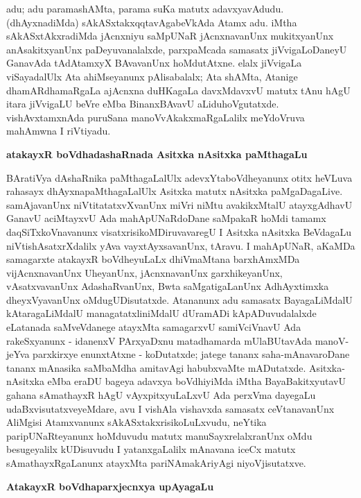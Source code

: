 adu; adu paramashAMta, parama suKa matutx adavxyavAdudu. (dhAyxnadiMda) sAkASxtakxqqtavAgabeVkAda Atamx adu. iMtha sAkASxtAkxradiMda jAcnxniyu saMpUNaR jAcnxnavanUnx mukitxyanUnx anAsakitxyanUnx paDeyuvanalalxde, parxpaMcada samasatx jiVvigaLoDaneyU GanavAda tAdAtamxyX BAvavanUnx hoMdutAtxne. elalx jiVvigaLa viSayadalUlx Ata ahiMseyanunx pAlisabalalx; Ata shAMta, Atanige dhamARdhamaRgaLa ajAcnxna duHKagaLa davxMdavxvU matutx tAnu hAgU itara jiVvigaLU beVre eMba BinanxBAvavU aLiduhoVgutatxde. vishAvxtamxnAda puruSana manoVvAkakxmaRgaLalilx meYdoVruva mahAmwna I riVtiyadu.

\bigskip
\begin{center}
{\Large\bf atakayxR boVdhadashaRnada Asitxka nAsitxka paMthagaLu}
\end{center}

BAratiVya dAshaRnika paMthagaLalUlx adevxYtaboVdheyanunx otitx heVLuva rahasayx dhAyxnapaMthagaLalUlx Asitxka matutx nAsitxka paMgaDagaLive. samAjavanUnx niVtitatatxvXvanUnx miVri niMtu avakikxMtalU atayxgAdhavU GanavU aciMtayxvU Ada mahApUNaR\-doDane saMpakaR hoMdi tamamx daqSiTxkoVnavanunx visatxrisikoMDiruvavaregU I Asitxka nAsitxka BeVdagaLu niVtishAsatxrXdalilx yAva vayxtAyxsavanUnx, tAravu. I mahApUNaR, aKaMDa samagarxte atakayxR boVdheyuLaLx dhiVmaMtana barxhAmxMDa vijAcnxnavanUnx UheyanUnx, jAcnxnavanUnx garxhikeyanUnx, vAsatxvavanUnx AdashaRvanUnx, Bwta saMgatigaLanUnx AdhAyxtimxka dheyxVyavanUnx oMdugUDisutatxde. Atananunx adu samasatx BayagaLiMdalU kAtaragaLiMdalU managatatxliniMdalU dUramADi kApADuvudalalxde eLatanada saMveVdanege atayxMta samagarxvU samiVciVnavU Ada rakeSxyanunx - idanenxV PArxyaDxnu matadhamarda mUlaBUtavAda manoV-jeYva parxkirxye enunxtAtxne - koDutatxde; jatege tananx saha-mAnavaroDane tananx mAnasika saMbaMdha amitavAgi habubxvaMte mADutatxde. Asitxka-nAsitxka eMba eraDU bageya adavxya boVdhiyiMda iMtha BayaBakitxyutavU gahana sAmathayxR hAgU vAyxpitxyuLaLxvU Ada perxVma dayegaLu udaBxvisutatxveyeMdare, avu I vishAla vishavxda samasatx ceVtanavanUnx AliMgisi Atamxvanunx sAkASxtakxrisikoLuLxvudu, neYtika paripUNaRteyanunx hoMduvudu matutx manuSayxrelalxranUnx oMdu besugeyalilx kUDisuvudu I yatanxgaLalilx mAnavana iceCx matutx sAmathayxRgaLanunx atayxMta pariNAmakAriyAgi niyoVjisutatxve.

\bigskip
\begin{center}
{\Large\bf AtakayxR boVdhaparxjecnxya upAyagaLu}
\end{center}

